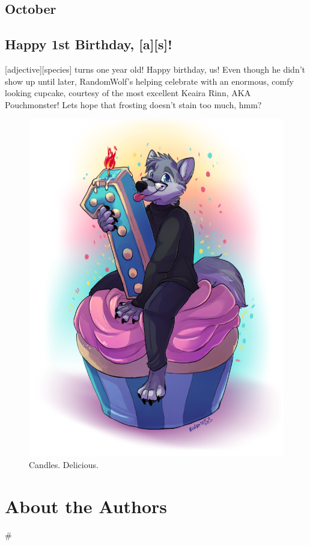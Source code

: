 \documentclass[12pt,letterpaper,oneside]{memoir}
\newcommand\secdiv{
  \begin{center}
    \#
  \end{center}
}
\begin{document}
  \chapter{October}
  
  
  
  

  \chapter{Happy 1st Birthday, [a][s]!}

  [adjective][species] turns one year old!  Happy birthday, us!  Even though he didn’t show up until later, RandomWolf’s helping celebrate with an enormous, comfy looking cupcake, courtesy of the most excellent Keaira Rinn, AKA Pouchmonster! Lets hope that frosting doesn’t stain too much, hmm?

  \begin{figure}
    \begin{center}
      \includegraphics[width=\textwidth]{content/assets/as-1}
    \end{center}
    \caption{Candles.  Delicious.}
  \end{figure}

  \part{About the Authors}
  

  \newpage
  \secdiv
\end{document}
